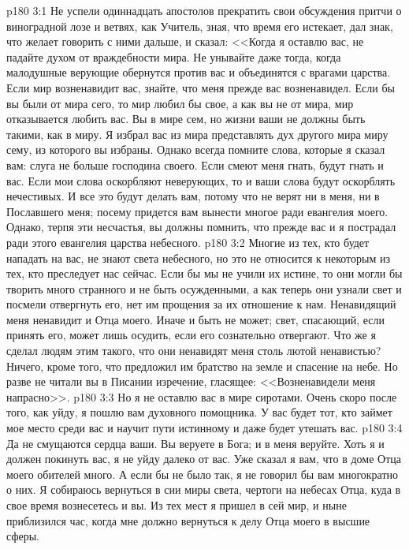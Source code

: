 \vs p180 3:1 Не успели одиннадцать апостолов прекратить свои обсуждения притчи о виноградной лозе и ветвях, как Учитель, зная, что время его истекает, дал знак, что желает говорить с ними дальше, и сказал: <<Когда я оставлю вас, не падайте духом от враждебности мира. Не унывайте даже тогда, когда малодушные верующие обернутся против вас и объединятся с врагами царства. Если мир возненавидит вас, знайте, что меня прежде вас возненавидел. Если бы вы были от мира сего, то мир любил бы свое, а как вы не от мира, мир отказывается любить вас. Вы в мире сем, но жизни ваши не должны быть такими, как в миру. Я избрал вас из мира представлять дух другого мира миру сему, из которого вы избраны. Однако всегда помните слова, которые я сказал вам: слуга не больше господина своего. Если смеют меня гнать, будут гнать и вас. Если мои слова оскорбляют неверующих, то и ваши слова будут оскорблять нечестивых. И все это будут делать вам, потому что не верят ни в меня, ни в Пославшего меня; посему придется вам вынести многое ради евангелия моего. Однако, терпя эти несчастья, вы должны помнить, что прежде вас и я пострадал ради этого евангелия царства небесного.
\vs p180 3:2 Многие из тех, кто будет нападать на вас, не знают света небесного, но это не относится к некоторым из тех, кто преследует нас сейчас. Если бы мы не учили их истине, то они могли бы творить много странного и не быть осужденными, а как теперь они узнали свет и посмели отвергнуть его, нет им прощения за их отношение к нам. Ненавидящий меня ненавидит и Отца моего. Иначе и быть не может; свет, спасающий, если принять его, может лишь осудить, если его сознательно отвергают. Что же я сделал людям этим такого, что они ненавидят меня столь лютой ненавистью? Ничего, кроме того, что предложил им братство на земле и спасение на небе. Но разве не читали вы в Писании изречение, гласящее: <<Возненавидели меня напрасно>>.
\vs p180 3:3 Но я не оставлю вас в мире сиротами. Очень скоро после того, как уйду, я пошлю вам духовного помощника. У вас будет тот, кто займет мое место среди вас и научит пути истинному и даже будет утешать вас.
\vs p180 3:4 Да не смущаются сердца ваши. Вы веруете в Бога; и в меня веруйте. Хоть я и должен покинуть вас, я не уйду далеко от вас. Уже сказал я вам, что в доме Отца моего обителей много. А если бы не было так, я не говорил бы вам многократно о них. Я собираюсь вернуться в сии миры света, чертоги на небесах Отца, куда в свое время вознесетесь и вы. Из тех мест я пришел в сей мир, и ныне приблизился час, когда мне должно вернуться к делу Отца моего в высшие сферы.
